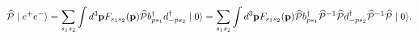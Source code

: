 \begin{equation}
\widehat{\mathcal{P}}\mid e^{+}e^{-}\rangle =\underset{s_{1}s_{2}}{\sum }%
\int d^{3}\mathbf{p}F_{s_{1}s_{2}}(\mathbf{p})\widehat{\mathcal{P}}%
b_{ps_{1}}^{\dagger }d_{-ps_{2}}^{\dagger }\mid 0\rangle =\underset{%
s_{1}s_{2}}{\sum }\int d^{3}\mathbf{p}F_{s_{1}s_{2}}(\mathbf{p})\widehat{%
\mathcal{P}}b_{ps_{1}}^{\dagger }\widehat{\mathcal{P}}^{-1}\widehat{\mathcal{%
P}}d_{-ps_{2}}^{\dagger }\widehat{\mathcal{P}}^{-1}\widehat{\mathcal{P}}\mid
0\rangle .
\end{equation}

